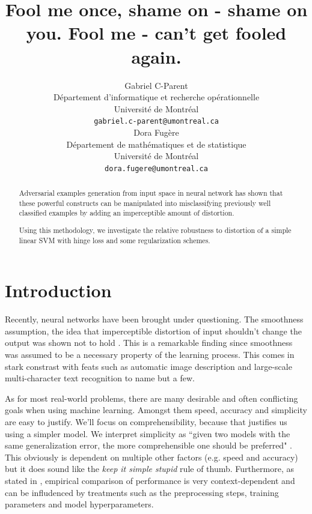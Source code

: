 \documentclass{article} %
\author{
Gabriel C-Parent\\
Département d’informatique et recherche opérationnelle\\
Université de Montréal\\
\texttt{gabriel.c-parent@umontreal.ca} \\
\And
Dora Fugère \\
Département de mathématiques et de statistique \\
Université de Montréal\\
\texttt{dora.fugere@umontreal.ca} \\
}
\begin{document}
\title{Fool me once, shame on - shame on you. \newline
       Fool me - can't get fooled again.}
      
\maketitle

\begin{abstract}
Adversarial examples generation from input space in neural network
has shown that these powerful constructs can be manipulated into misclassifying previously well classified examples by adding an imperceptible
amount of distortion.

Using this methodology, we investigate the relative robustness to distortion of a simple linear SVM with
hinge loss and some regularization schemes.
\end{abstract}


\section{Introduction}

Recently, neural networks have been brought under questioning. The smoothness
assumption, the idea that imperceptible distortion of input shouldn't change
the output was shown not to hold \citep{szegedy_intriguing_2013}. This is a
remarkable finding since smoothness was assumed to be a necessary property of the
learning process.
This comes in stark constrast with feats such as automatic image description
\citep{vinyals_show_2014} and large-scale multi-character text recognition
\citep{goodfellow_multi-digit_2013} to name but a few.

As for most real-world problems, there are many desirable and often conflicting
goals when using machine learning. Amongst them speed, accuracy and simplicity
are easy to justify. We'll focus on comprehensibility, because that justifies
us using a simpler model.
We interpret simplicity as ``given two models with the same generalization error, the more
comprehensible one should be preferred" \citep{domingos_role_1999}.
This obviously is dependent on multiple other factors (e.g. speed and accuracy)
but it does sound like the \textit{keep it simple stupid} rule of thumb.
Furthermore, as stated in \citep{hand_classifier_2006}, empirical comparison of
performance is very context-dependent and can be infludenced by treatments such 
as the preprocessing steps, training parameters and model hyperparameters.
\end{document}
